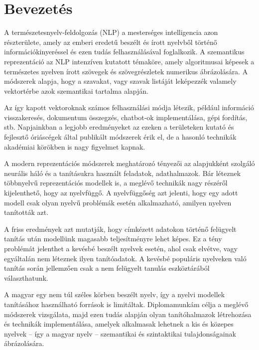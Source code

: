 \chapter{Bevezetés} %
\label{ch:intro}

A természetesnyelv-feldolgozás (NLP) a mesterséges intelligencia azon részterülete, amely az emberi eredetű beszélt és írott nyelvből történő információkinyeréssel és ezen tudás felhasználásával foglalkozik. A szemantikus reprezentáció az NLP intenzíven kutatott témaköre, amely algoritmusai képesek a természetes nyelven írott szövegek és szövegrészletek numerikus ábrázolására. A módszerek alapja, hogy a szavakat, vagy szavak listáját leképezzék valamely vektortérbe azok szemantikai tartalma alapján. 

Az így kapott vektoroknak számos felhasználási módja létezik, például információ visszakeresés, dokumentum összegzés, chatbot-ok implementálása, gépi fordítás, stb. Napjainkban a legjobb eredményeket az ezeken a területeken kutató és fejlesztő óriáscégek által publikált módszerek érik el, de a hasonló technikák akadémiai körökben is nagy figyelmet kapnak.

A modern reprezentációs módszerek meghatározó tényezői az alapjukként szolgáló neurális háló és a tanításukra használt feladatok, adathalmazok.
Bár léteznek többnyelvű reprezentációs modellek is, a meglévő technikák nagy részéről kijelenthető, hogy az nyelvfüggő. A nyelvfüggőség azt jelenti, hogy egy adott modell csak olyan nyelvű problémák esetén alkalmazható, amilyen nyelven tanították azt.

A friss eredmények azt mutatják, hogy címkézett adatokon történő felügyelt tanítás után modellünk magasabb teljesítményre lehet képes. Ez a tény problémát jelenthet a kevésbé beszélt nyelvek esetén, ahol csak elvétve, vagy egyáltalán nem léteznek ilyen tanítóadatok. A kevésbé populáris nyelveken való tanítás során jellemzően csak a nem felügyelt tanulás eszköztárából választhatunk.

A magyar egy nem túl széles körben beszélt nyelv, így a nyelvi modellek tanításához használható források is limitáltak. Diplomamunkám célja a meglévő módszerek vizsgálata, majd ezen tudás alapján olyan tanítóhalmazok létrehozása és technikák implementálása, amelyek alkalmasak lehetnek a kis és közepes nyelvek – így a magyar nyelv – szemantikai és szintaktikai tulajdonságainak ábrázolására. 
